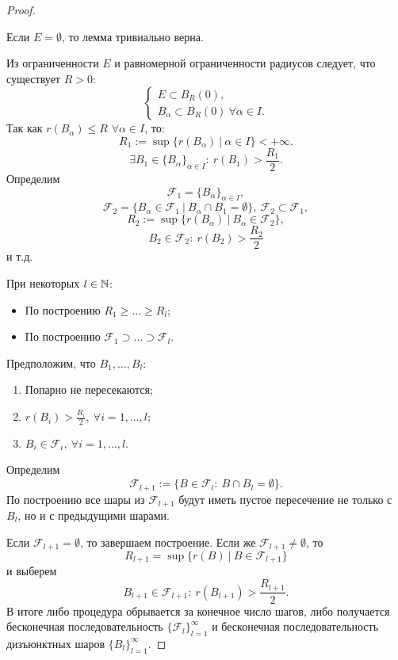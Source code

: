 \begin{proof}
    \begin{remark}
        Если $E = \emptyset$, то лемма тривиально верна.
    \end{remark}
    Из ограниченности $E$ и равномерной ограниченности радиусов следует, что существует $R > 0$:
    \[\begin{cases}
        E \subset B_R(0),\\
        B_\alpha \subset B_R(0) \ \forall \alpha \in I.
    \end{cases}\]
    Так как $r(B_\alpha) \leqslant R$ $\forall \alpha \in I$, то:
    \[R_1 := \sup\{r(B_\alpha) \ | \ \alpha \in I\} < +\infty.\]
    \[\exists B_1 \in \{B_\alpha\}_{\alpha \in I}: \ r(B_1) > \frac{R_1}{2}.\]
    Определим
    \[\mathcal{F}_1 = \{B_\alpha\}_{\alpha \in I},\]
    \[\mathcal{F}_2 = \{B_\alpha \in \mathcal{F}_1 \ | \ B_\alpha \cap B_1 = \emptyset\}, \ \mathcal{F}_2 \subset \mathcal{F}_1,\]
    \[R_2 := \sup\{r(B_\alpha) \ | \ B_\alpha \in \mathcal{F}_2\},\]
    \[B_2 \in \mathcal{F}_2: \ r(B_2) > \frac{R_2}{2}\]
    и т.д.

    \noindent При некоторых $l \in \mathbb{N}$:
    \begin{itemize}
        \item По построению $R_1 \geqslant \dots \geqslant R_l$;
        \item По построению $\mathcal{F}_1 \supset \dots \supset \mathcal{F}_l$.
    \end{itemize}
    
    \noindent Предположим, что $B_1, \dots, B_l$:
        \begin{enumerate}
            \item Попарно не пересекаются;
            \item $r(B_i) > \frac{R_i}{2} ,\ \forall i = 1, \dots, l$;
            \item $B_i \in \mathcal{F}_i, \ \forall i = 1, \dots, l$.
        \end{enumerate}
    Определим
    \[\mathcal{F}_{l+1} := \{B \in \mathcal{F}_l: \ B \cap B_l = \emptyset\}.\]
    По построению все шары из $\mathcal{F}_{l+1}$ будут иметь пустое пересечение не только с $B_l$, но и с предыдущими шарами.

    Если $\mathcal{F}_{l+1} = \emptyset$, то завершаем построение.
    Если же $\mathcal{F}_{l+1} \neq \emptyset$, то
    \[R_{l+1} = \sup\{r(B) \ | \ B \in \mathcal{F}_{l+1}\}\]
    и выберем
    \[B_{l+1} \in \mathcal{F}_{l+1}: \ r(B_{l+1}) > \frac{R_{l+1}}{2}.\]
    В итоге либо процедура обрывается за конечное число шагов, либо получается бесконечная последовательность $\{\mathcal{F}_l\}_{l=1}^\infty$ и бесконечная последовательность дизъюнктных шаров $\{B_l\}_{l=1}^\infty$.


\end{proof}
